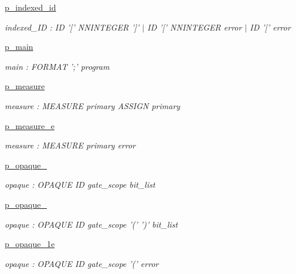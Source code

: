 \begin{DoxyCompactItemize}
\hyperlink{namespaceqat_1_1interop_1_1qasm__parser_1_1OqasmParser_1_1p__indexed__id}{p\-\_\-indexed\-\_\-id}
\begin{DoxyCompactList}\small\item\em indexed\-\_\-\-I\-D \-: I\-D '\mbox{[}' N\-N\-I\-N\-T\-E\-G\-E\-R '\mbox{]}' $|$ I\-D '\mbox{[}' N\-N\-I\-N\-T\-E\-G\-E\-R error $|$ I\-D '\mbox{[}' error \end{DoxyCompactList}\item 
\hyperlink{namespaceqat_1_1interop_1_1qasm__parser_1_1OqasmParser_1_1p__main}{p\-\_\-main}
\begin{DoxyCompactList}\small\item\em main \-: F\-O\-R\-M\-A\-T ';' program \end{DoxyCompactList}\item 
\hyperlink{namespaceqat_1_1interop_1_1qasm__parser_1_1OqasmParser_1_1p__measure}{p\-\_\-measure}
\begin{DoxyCompactList}\small\item\em measure \-: M\-E\-A\-S\-U\-R\-E primary A\-S\-S\-I\-G\-N primary \end{DoxyCompactList}\item 
\hyperlink{namespaceqat_1_1interop_1_1qasm__parser_1_1OqasmParser_1_1p__measure__e}{p\-\_\-measure\-\_\-e}
\begin{DoxyCompactList}\small\item\em measure \-: M\-E\-A\-S\-U\-R\-E primary error \end{DoxyCompactList}\item 
\hyperlink{namespaceqat_1_1interop_1_1qasm__parser_1_1OqasmParser_1_1p__opaque__0}{p\-\_\-opaque\-\_}
\begin{DoxyCompactList}\small\item\em opaque \-: O\-P\-A\-Q\-U\-E I\-D gate\-\_\-scope bit\-\_\-list \end{DoxyCompactList}\item 
\hyperlink{namespaceqat_1_1interop_1_1qasm__parser_1_1OqasmParser_1_1p__opaque__1}{p\-\_\-opaque\-\_}
\begin{DoxyCompactList}\small\item\em opaque \-: O\-P\-A\-Q\-U\-E I\-D gate\-\_\-scope '(' ')' bit\-\_\-list \end{DoxyCompactList}\item 
\hyperlink{namespaceqat_1_1interop_1_1qasm__parser_1_1OqasmParser_1_1p__opaque__1e}{p\-\_\-opaque\-\_\-1e}
\begin{DoxyCompactList}\small\item\em opaque \-: O\-P\-A\-Q\-U\-E I\-D gate\-\_\-scope '(' error \end{DoxyCompactList}\item 

\end{DoxyCompactItemize}
